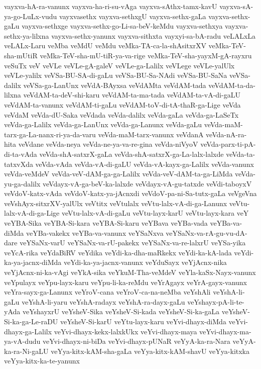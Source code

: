 {vayxva-hA-ra-vanunx
vayxva-ha-ri-su-vAga
vayxva-sAthx-tamx-kavU
vayxva-sA-ya-go-LuLx-vudu
vayxvasethx
vayxva-sethxgU
vayxva-sethx-gaLa
vayxva-sethx-gaLu
vayxva-sethxge
vayxva-sethx-go-Li-sa-beV-keMdu
vayxva-sethxya
vayxva-sethx-ya-lilxna
vayxva-sethx-yanunx
vayxva-sithxta
vayxyi-sa-bA-radu
veLALxLa
veLALx-Laru
veMba
veMdU
veMdu
veMka-TA-ca-la-shAsitxrXV
veMka-TeV-sha-mUtiR
veMka-TeV-sha-mU-tiR-ya-va-rige
veMka-TeV-sha-yayxM-gA-rayxru
veSuTx
veV
veVLe
veVLe-gA-galeV
veVLe-ga-Lalilx
veVLege
veVLe-yalUlx
veVLe-yalilx
veVSa-BU-SA-di-gaLu
veVSa-BU-Sa-NAdi
veVSa-BU-SaNa
veVSa-dalilx
veVSa-ga-LanUnx
veVdA-BAyxsa
veVdAMta
veVdAM-tada
veVdAM-ta-da-lilxna
veVdAM-ta-deV-shi-karu
veVdAM-ta-ma-tada
veVdAM-ta-vA-di-gaLU
veVdAM-ta-vanunx
veVdAM-ti-gaLu
veVdAM-toV-di-tA-thaR-ga-Lige
veVda
veVdaM
veVda-dU-Saka
veVdada
veVda-dalilx
veVda-gaLa
veVda-ga-LaSeTx
veVda-ga-Lalilx
veVda-ga-LanUnx
veVda-ga-Lanunx
veVda-gaLu
veVda-maM-tarx-ga-La-nanx-ri-ya-da-varu
veVda-maM-tarx-vanunx
veVdanA
veVda-nA-ra-hita
veVdane
veVda-neya
veVda-ne-ya-va-re-gina
veVda-niVyoV
veVda-parx-ti-pA-di-ta-vAda
veVda-shA-satxrX-gaLa
veVda-shA-satxrX-ga-La-lalx-lalxde
veVda-ta-tatxvXda
veVda-vAda
veVda-vA-di-gaLU
veVda-vA-kayx-ga-Lalilx
veVda-vanunx
veVda-veMdeV
veVda-veV-dAM-ga-ga-Lalilx
veVda-veV-dAM-ta-ga-LiMda
veVda-yu-ga-dalilx
veVdayx-vA-ga-beV-ka-lalxde
veVdayx-vA-gu-tatxde
veVdi-taboyxV
veVdoV-katx-vAda
veVdoV-katx-ya-jAcnxdi
veVdoV-pa-ni-Sa-tutx-gaLa
veVgeVna
veVshAyx-sitxrXV-yalUlx
veVtitx
veVtulalx
veVtu-lalx-vA-di-ga-Lanunx
veVtu-lalx-vA-di-ga-Lige
veVtu-lalx-vA-di-gaLu
veVtu-layx-karU
veVtu-layx-kara
veY
veYBA-Sika
veYBA-Si-kara
veYBA-Si-karu
veYBava
veYBa-vada
veYBa-va-diMda
veYBa-vakekx
veYBa-va-vanunx
veYSaNxva
veYSaNx-va-rA-gu-vu-dA-dare
veYSaNx-varU
veYSaNx-va-rU-pakekx
veYSaNx-va-re-lalxrU
veYSa-yika
veYcA-rika
veYdaBiRV
veYdika
veYdi-ka-dha-maRkekx
veYdi-ka-kA-lada
veYdi-ka-ya-jacnx-diMda
veYdi-ka-ya-jacnx-vanunx
veYduSayx
veYjAcnx-nika
veYjAcnx-ni-ka-vAgi
veYkA-sika
veYkuM-Tha-veMdeV
veYla-kaSx-Nayx-vanunx
veYpulayx
veYpu-layx-karu
veYpu-li-ka-reMdu
veYrAgayx
veYrA-gayx-vanunx
veYra-sayx-ga-Lanunx
veYroV-cana
veYroV-ca-na-neMba
veYshAli
veYshA-li-gaLu
veYshA-li-yaru
veYshA-radayx
veYshA-ra-dayx-gaLu
veYshayx-pA-li-te-yAda
veYshayxrU
veYsheV-Sika
veYsheV-Si-kada
veYsheV-Si-ka-gaLa
veYsheV-Si-ka-ga-Le-raDU
veYsheV-Si-karU
veYtu-layx-karu
veYvi-dhayx-diMda
veYvi-dhayx-ga-Lalilx
veYvi-dhayx-kekx-lalxkUkx
veYvi-dhayx-maya
veYvi-dhayx-ma-ya-vA-dudu
veYvi-dhayx-ni-biDa
veYvi-dhayx-pUNaR
veYyA-ka-ra-Nara
veYyA-ka-ra-Ni-gaLU
veYya-kitx-kAM-sha-gaLa
veYya-kitx-kAM-shavU
veYya-kitxka
veYya-kitx-ka-te-yanunx
}
